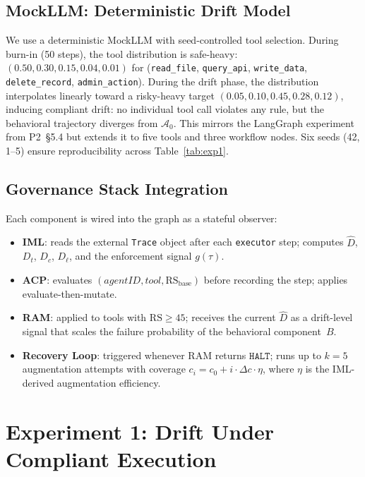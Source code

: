 \documentclass[11pt]{article}
\newcommand{\Azero}{\mathcal{A}_0}
\newcommand{\Dhat}{\widehat{D}}
\newcommand{\HALT}{\texttt{HALT}}
\newcommand{\RS}{\mathrm{RS}}
\begin{document}
\subsection{MockLLM: Deterministic Drift Model}

We use a deterministic MockLLM with seed-controlled tool selection.
During burn-in (50 steps), the tool distribution is safe-heavy:
$(0.50, 0.30, 0.15, 0.04, 0.01)$ for
(\texttt{read\_file}, \texttt{query\_api}, \texttt{write\_data},
\texttt{delete\_record}, \texttt{admin\_action}).
During the drift phase, the distribution interpolates linearly toward a
risky-heavy target $(0.05, 0.10, 0.45, 0.28, 0.12)$, inducing compliant
drift: no individual tool call violates any rule, but the behavioral
trajectory diverges from $\Azero$.
This mirrors the LangGraph experiment from P2~\S5.4 but extends it to
five tools and three workflow nodes.
Six seeds (42, 1--5) ensure reproducibility across Table~\ref{tab:exp1}.

\subsection{Governance Stack Integration}

Each component is wired into the graph as a stateful observer:
\begin{itemize}[leftmargin=2em, topsep=2pt]
  \item \textbf{IML}: reads the external \texttt{Trace} object after each
        \texttt{executor} step; computes $\Dhat$, $D_t$, $D_c$, $D_\ell$,
        and the enforcement signal $g(\tau)$.
  \item \textbf{ACP}: evaluates $(agentID, tool, \RS_{\mathrm{base}})$
        before recording the step; applies evaluate-then-mutate.
  \item \textbf{RAM}: applied to tools with $\RS \geq 45$; receives
        the current $\Dhat$ as a drift-level signal that scales the
        failure probability of the behavioral component~$B$.
  \item \textbf{Recovery Loop}: triggered whenever RAM returns $\HALT$;
        runs up to $k=5$ augmentation attempts with coverage
        $c_i = c_0 + i \cdot \Delta c \cdot \eta$, where $\eta$ is
        the IML-derived augmentation efficiency.
\end{itemize}

\section{Experiment 1: Drift Under Compliant Execution}
\label{sec:exp1}
\end{document}
